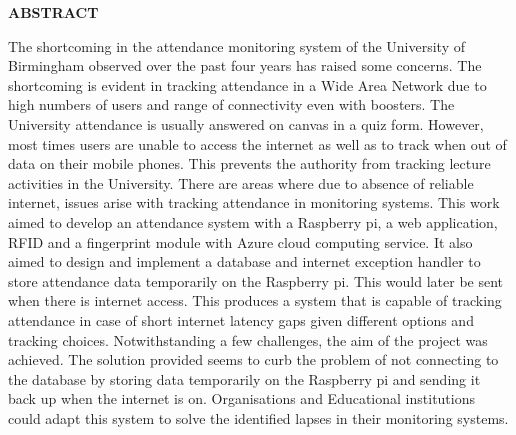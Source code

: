 \providecommand\phantomsection{} \phantomsection
{}
\begin{center}
\providecommand\pdfbookmark[3][]{} \pdfbookmark[0]{Abstract}{bm:Abstract}
\vspace*{1in}
\textbf{ABSTRACT}\\[2\baselineskip]
\end{center}

The shortcoming in the attendance monitoring system of the University of Birmingham observed over the past four years has raised some concerns. The shortcoming is evident in tracking attendance in a Wide Area Network due to high numbers of users and range of connectivity even with boosters. The University attendance is usually answered on canvas in a quiz form. However, most times users are unable to access the internet as well as to track when out of data on their mobile phones. This prevents the authority from tracking lecture activities in the University. There are areas where due to absence of reliable internet, issues arise with tracking attendance in monitoring systems.
This work aimed to develop an attendance system with a Raspberry pi, a web application, \gls{RFID} and a fingerprint module with Azure cloud computing service. It also aimed to design and implement a database and internet exception handler to store attendance data temporarily on the Raspberry pi. This would later be sent when there is internet access.
This produces a system that is capable of tracking attendance in case of short internet latency gaps given different options and tracking choices. Notwithstanding a few challenges, the aim of the project was achieved. The solution provided seems to curb the problem of not connecting to the database by storing data temporarily on the Raspberry pi and sending it back up when the internet is on. Organisations and Educational institutions could adapt this system to solve the identified lapses in their monitoring systems.
